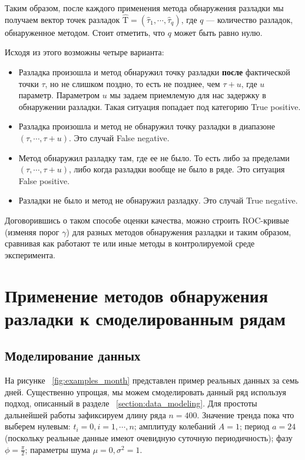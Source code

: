 \documentclass[%
12pt,
master,  %
natbib,      %
subf,        %
substylefile = spbu.rtx,
href,        %
colorlinks,  %
]{disser}
\begin{document}
Таким образом, после каждого применения метода обнаружения разладки мы получаем вектор точек разладок $ \mathrm{\hat{T}} = (\hat{\tau}_1, \cdots, \hat{\tau}_q) $, где $q$ --- количество разладок, обнаруженное методом. Стоит отметить, что $q$ может быть равно нулю.

Исходя из этого возможны четыре варианта:
\begin{itemize}
	\item Разладка произошла и метод обнаружил точку разладки \textbf{после} фактической точки $\tau$, но не слишком поздно, то есть не позднее, чем $\tau + u$, где $u$ параметр. Параметром $u$ мы задаем приемлемую для нас задержку в обнаружении разладки. Такая ситуация попадает под категорию True positive.
	\item Разладка произошла и метод не обнаружил точку разладки в диапазоне $(\tau, \cdots, \tau + u)$. Это случай False negative.
	\item Метод обнаружил разладку там, где ее не было. То есть либо за пределами $(\tau, \cdots, \tau + u)$, либо когда разладки вообще не было в ряде. Это ситуация False positive.
	\item Разладки не было и метод не обнаружил разладку. Это случай True negative.
\end{itemize}

Договорившись о таком способе оценки качества, можно строить ROC-кривые (изменяя порог $\gamma$) для разных методов обнаружения разладки и таким образом, сравнивая как работают те или иные методы в контролируемой среде эксперимента.


\chapter{Применение методов обнаружения разладки к смоделированным рядам}


\section{Моделирование данных}

На рисунке ~\ref{fig:examples_month} представлен пример реальных данных за семь дней. Существенно упрощая, мы можем смоделировать данный ряд используя подход, описанный в разделе ~\ref{section:data_modeling}. Для простоты дальнейшей работы зафиксируем длину ряда $n = 400$. Значение тренда пока что выберем нулевым: $t_i = 0, i = 1,\cdots, n$; амплитуду колебаний $A = 1$; период $ a = 24 $ (поскольку реальные данные имеют очевидную суточную периодичность); фазу $\phi = \frac{\pi}{2}$; параметры шума $\mu = 0, \sigma^2 = 1$.
\end{document}

